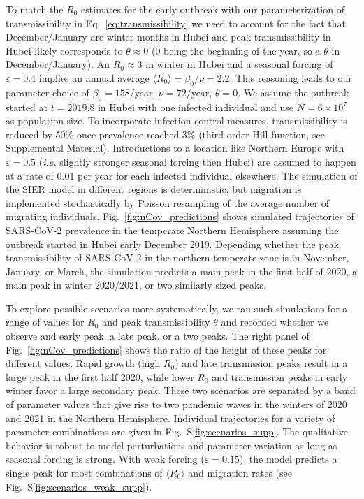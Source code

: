 \documentclass[rmp, reprint, superscriptaddress, floatfix,amsmath]{revtex4-1}
\newcommand{\forcing}{\varepsilon}
\begin{document}
To match the $R_0$ estimates for the early outbreak with our parameterization of transmissibility in Eq.~\ref{eq:transmissibility} we need to account for the fact that December/January are winter months in Hubei and peak transmissibility in Hubei likely corresponds to $\theta\approx 0$ (0 being the beginning of the year, so a $\theta$ in December/January). An $R_0\approx 3$ in winter in Hubei and a seasonal forcing of $\forcing=0.4$ implies an annual average $\langle R_0\rangle = \beta_0/\nu=2.2$.
This reasoning leads to our parameter choice of $\beta_0=158$/year, $\nu=72$/year, $\theta=0$. 
We assume the outbreak started at $t=2019.8$ in Hubei with one infected individual and use $N=6\times 10^{7}$ as population size.
To incorporate infection control measures, transmissibility is reduced by 50\% once prevalence reached 3\% (third order Hill-function, see Supplemental Material).
Introductions to a location like Northern Europe with $\forcing=0.5$ (\textit{i.e.} slightly stronger seasonal forcing then Hubei) are assumed to happen at a rate of 0.01 per year for each infected individual elsewhere.
The simulation of the SIER model in different regions is deterministic, but migration is implemented stochastically by Poisson resampling of the average number of migrating individuals. 
Fig.~\ref{fig:nCov_predictions} shows simulated trajectories of SARS-CoV-2 prevalence in the temperate Northern Hemisphere assuming the outbreak started in Hubei early December 2019.
Depending whether the peak transmissibility of SARS-CoV-2 in the northern temperate zone is in November, January, or March, the simulation predicts a main peak in the first half of 2020, a main peak in winter 2020/2021, or two similarly sized peaks.

To explore possible scenarios more systematically, we ran such simulations for a range of values for $R_0$ and peak transmissibility $\theta$ and recorded whether we observe and early peak, a late peak, or a two peaks. 
The right panel of Fig.~\ref{fig:nCov_predictions} shows the ratio of the height of these peaks for different values.
Rapid growth (high $R_0$) and late transmission peaks result in a large peak in the first half 2020, while lower $R_0$ and transmission peaks in early winter favor a large secondary peak. 
These two scenarios are separated by a band of parameter values that give rise to two pandemic waves in the winters of 2020 and 2021 in the Northern Hemisphere.
Individual trajectories for a variety of parameter combinations are given in Fig.~S\ref{fig:scenarios_supp}.
The qualitative behavior is robust to model perturbations and parameter variation as long as seasonal forcing is strong. 
With weak forcing ($\forcing=0.15$), the model predicts a single peak for most combinations of $\langle R_0 \rangle$ and migration rates (see Fig.~S\ref{fig:scenarios_weak_supp}).
\end{document}
